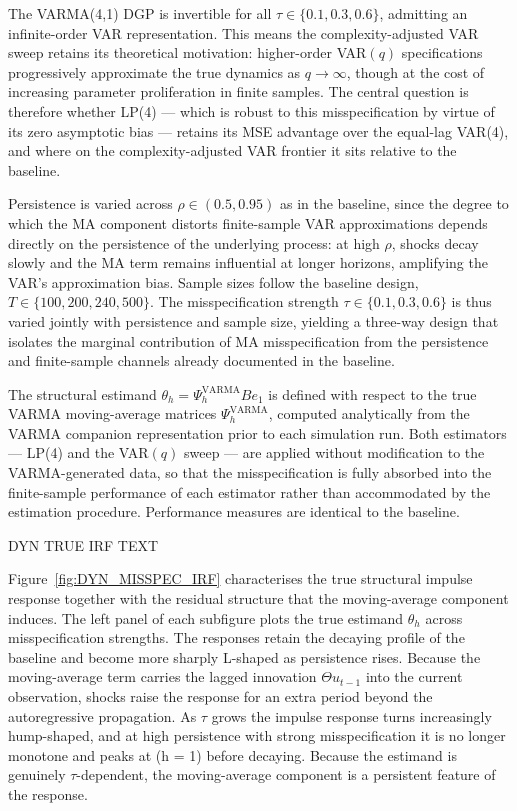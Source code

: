 The VARMA(4,1) DGP is invertible for all $\tau \in \{0.1, 0.3, 0.6\}$, 
admitting an infinite-order VAR representation. This means the complexity-adjusted 
VAR sweep retains its theoretical motivation: higher-order VAR$(q)$ specifications 
progressively approximate the true dynamics as $q \to \infty$, though at the cost 
of increasing parameter proliferation in finite samples. The central question is 
therefore whether LP(4) --- which is robust to this misspecification by virtue of 
its zero asymptotic bias \parencite{olea2025local} --- retains its MSE 
advantage over the equal-lag VAR(4), and where on the complexity-adjusted VAR 
frontier it sits relative to the baseline.

Persistence is varied across $\rho \in (0.5, 0.95)$ as in the baseline, 
since the degree to which the MA component distorts finite-sample VAR 
approximations depends directly on the persistence of the underlying process: 
at high $\rho$, shocks decay slowly and the MA term remains influential at 
longer horizons, amplifying the VAR's approximation bias. Sample sizes follow 
the baseline design, $T \in \{100, 200, 240, 500\}$. The misspecification 
strength $\tau \in \{0.1, 0.3, 0.6\}$ is thus varied jointly with 
persistence and sample size, yielding a three-way design that isolates the 
marginal contribution of MA misspecification from the persistence and 
finite-sample channels already documented in the baseline.

The structural estimand $\theta_h = \Psi_h^{\mathrm{VARMA}} B e_1$ is defined 
with respect to the true VARMA moving-average matrices $\Psi_h^{\mathrm{VARMA}}$, 
computed analytically from the VARMA companion representation prior to each 
simulation run. Both estimators --- LP(4) and the VAR$(q)$ sweep --- are applied 
without modification to the VARMA-generated data, so that the misspecification 
is fully absorbed into the finite-sample performance of each estimator rather 
than accommodated by the estimation procedure. Performance measures are identical 
to the baseline.

DYN TRUE IRF TEXT

Figure~\ref{fig:DYN_MISSPEC_IRF} characterises the true structural impulse response together 
with the residual structure that the moving-average component induces. The left panel of 
each subfigure plots the true estimand $\theta_h$ across misspecification strengths. 
The responses retain the decaying profile of the baseline and become more sharply L-shaped 
as persistence rises. Because the moving-average term carries the lagged innovation 
$\Theta u_{t-1}$ into the current observation, shocks raise the response for an extra period 
beyond the autoregressive propagation. As $\tau$ grows the impulse response turns increasingly 
hump-shaped, and at high persistence with strong misspecification it is no longer monotone 
and peaks at (h = 1) before decaying. Because the estimand is genuinely $\tau$-dependent, 
the moving-average component is a persistent feature of the response.


